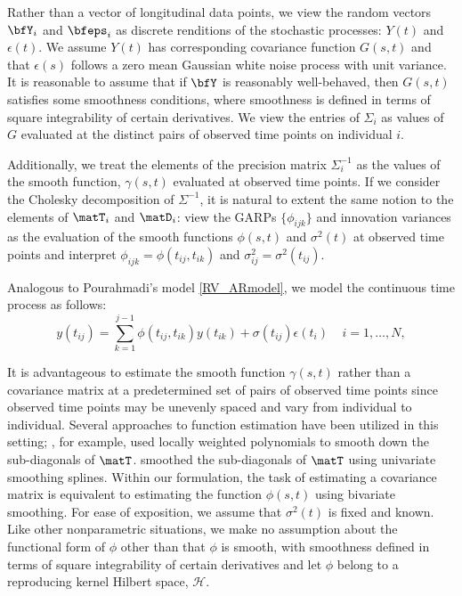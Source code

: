 
Rather than a vector of longitudinal data points, we view the random vectors $\bfY_i$ and $\bfeps_i$ as discrete renditions of the stochastic processes: $Y\left(t\right)$ and $\epsilon\left(t\right)$.  We assume $Y\left(t\right)$ has corresponding covariance function $G\left(s,t\right)$ and that $\epsilon\left(s\right)$ follows a zero mean Gaussian white noise process with unit variance. It is reasonable to assume that if $\bfY$ is reasonably well-behaved, then $G\left(s,t\right)$ satisfies some smoothness conditions, where smoothness is defined in terms of square integrability of certain derivatives. We view the entries of $\Sigma_i$ as values of $G$ evaluated at the distinct pairs of observed time points on individual $i$. 

Additionally, we treat the elements of the precision matrix $\Sigma_i^{-1}$ as the values of the smooth function, $\gamma\left(s,t\right)$ evaluated at observed time points. If we consider the Cholesky decomposition of $\Sigma^{-1}$, it is natural to extent the same notion to the elements of $\matT_i$ and $\matD_i$: view the GARPs $\lbrace \phi_{ijk} \rbrace$ and innovation variances as the evaluation of the smooth functions $\phi\left(s,t\right)$ and $\sigma^2\left(t\right)$ at observed time points and interpret $\phi_{ijk} = \phi\left(t_{ij},t_{ik}\right)$ and $\sigma_{ij}^2 = \sigma^2\left(t_{ij}\right)$. 

Analogous to Pourahmadi's model \eqref{RV_ARmodel}, we model the continuous time process as follows: 
\begin{equation}   
y\left(t_{ij} \right)  = \sum_{k=1}^{j-1} \phi\left(t_{ij} ,t_{ik}\right) y\left(t_{ik}\right) + \sigma\left(t_{ij}\right)\epsilon\left({t_i}\right) \;\;\;\; i=1,\dots, N, 
\label{eq:MyModel} 
\end{equation}

It is advantageous to estimate the smooth function $\gamma\left(s,t\right)$ rather than a covariance matrix at a predetermined set of pairs of observed time points since observed time points may be unevenly spaced and vary from individual to individual. Several approaches to function estimation have been utilized in this setting; \cite{wu2003nonparametric}, for example, used locally weighted polynomials to smooth down the sub-diagonals of $\matT$. \cite{huang2007estimation} smoothed the sub-diagonals of $\matT$ using univariate smoothing splines.  Within our formulation, the task of estimating a covariance matrix is equivalent to estimating the function $\phi\left(s,t\right)$ using bivariate smoothing. For ease of exposition, we assume that $\sigma^2\left(t\right)$ is fixed and known. Like other nonparametric situations, we make no assumption about the functional form of $\phi$ other than that $\phi$ is smooth, with smoothness defined in terms of square integrability of certain derivatives and let $\phi$ belong to a reproducing kernel Hilbert space, $\mathcal{H}$.

